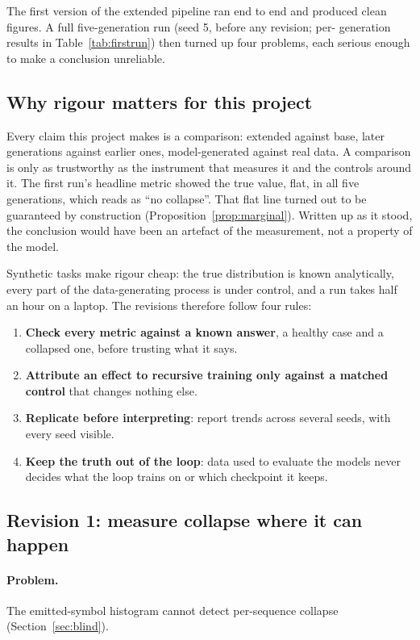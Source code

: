 \documentclass[11pt,a4paper]{article}
\begin{document}
The first version of the extended pipeline ran end to end and produced clean
figures. A full five-generation run (seed 5, before any revision; per-
generation results in Table~\ref{tab:firstrun}) then turned up four problems,
each serious enough to make a conclusion unreliable.

\subsection{Why rigour matters for this project}
Every claim this project makes is a comparison: extended against base, later
generations against earlier ones, model-generated against real data. A
comparison is only as trustworthy as the instrument that measures it and the
controls around it. The first run's headline metric showed the true value,
flat, in all five generations, which reads as ``no collapse''. That flat line
turned out to be guaranteed by construction
(Proposition~\ref{prop:marginal}). Written up as it stood, the conclusion
would have been an artefact of the measurement, not a property of the model.

Synthetic tasks make rigour cheap: the true distribution is known
analytically, every part of the data-generating process is under control,
and a run takes half an hour on a laptop. The revisions therefore follow four
rules:
\begin{enumerate}[leftmargin=1.6em]
  \item \textbf{Check every metric against a known answer}, a healthy case and
        a collapsed one, before trusting what it says.
  \item \textbf{Attribute an effect to recursive training only against a
        matched control} that changes nothing else.
  \item \textbf{Replicate before interpreting}: report trends across several
        seeds, with every seed visible.
  \item \textbf{Keep the truth out of the loop}: data used to evaluate the
        models never decides what the loop trains on or which checkpoint it
        keeps.
\end{enumerate}

\subsection{Revision 1: measure collapse where it can happen}\label{sec:r1}
\paragraph{Problem.} The emitted-symbol histogram cannot detect per-sequence
collapse (Section~\ref{sec:blind}).
\end{document}
